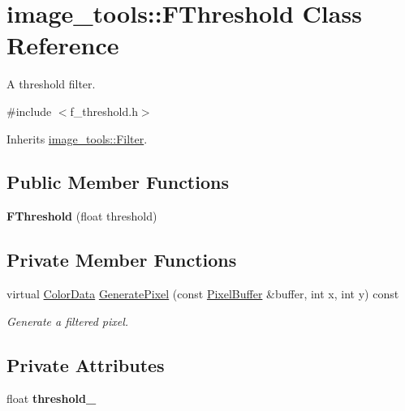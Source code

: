 \hypertarget{classimage__tools_1_1FThreshold}{}\section{image\+\_\+tools\+:\+:F\+Threshold Class Reference}
\label{classimage__tools_1_1FThreshold}


A threshold filter.  




{\ttfamily \#include $<$f\+\_\+threshold.\+h$>$}



Inherits \hyperlink{classimage__tools_1_1Filter}{image\+\_\+tools\+::\+Filter}.

\subsection*{Public Member Functions}
\begin{DoxyCompactItemize}
\item 
{\bfseries F\+Threshold} (float threshold)\hypertarget{classimage__tools_1_1FThreshold_a999a5dfc3f95d147b4030789ebb77931}{}\label{classimage__tools_1_1FThreshold_a999a5dfc3f95d147b4030789ebb77931}

\end{DoxyCompactItemize}
\subsection*{Private Member Functions}
\begin{DoxyCompactItemize}
\item 
virtual \hyperlink{classimage__tools_1_1ColorData}{Color\+Data} \hyperlink{classimage__tools_1_1FThreshold_a39d2402969ac038c7ab132f68a754637}{Generate\+Pixel} (const \hyperlink{classimage__tools_1_1PixelBuffer}{Pixel\+Buffer} \&buffer, int x, int y) const 
\begin{DoxyCompactList}\small\item\em Generate a filtered pixel. \end{DoxyCompactList}\end{DoxyCompactItemize}
\subsection*{Private Attributes}
\begin{DoxyCompactItemize}
\item 
float {\bfseries threshold\+\_\+}\hypertarget{classimage__tools_1_1FThreshold_aa6cad820a5bfbdc61f38e34aca51018e}{}\label{classimage__tools_1_1FThreshold_aa6cad820a5bfbdc61f38e34aca51018e}

\end{DoxyCompactItemize}


